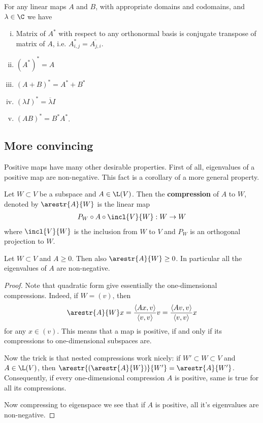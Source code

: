 \begin{lause}\label{basic_adjoint}
	For any linear maps $A$ and $B$, with appropriate domains and codomains, and $\lambda \in \C$ we have
	\begin{enumerate}[i)]
		\item Matrix of $A^{*}$ with respect to any orthonormal basis is conjugate transpose of matrix of $A$, i.e. $A^{*}_{i, j} = \overline{A_{j, i}}$.
		\item $(A^{*})^{*} = A$
		\item $(A + B)^{*} = A^{*} + B^{*}$
		\item $(\lambda I)^{*} = \overline{\lambda} I$
		\item $(AB)^{*} = B^{*}A^{*}$.
	\end{enumerate}
\end{lause}

\subsection{More convincing}

Positive maps have many other desirable properties. First of all, eigenvalues of a positive map are non-negative. This fact is a corollary of a more general property.

\begin{maar}
	Let $W \subset V$ be a subspace and $A \in \L(V)$. Then the \textbf{compression} of $A$ to $W$, denoted by $\arestr{A}{W}$ is the linear map
	\begin{align*}
		P_{W} \circ A \circ \incl{V}{W} : W \to W
	\end{align*}
	where $\incl{V}{W}$ is the inclusion from $W$ to $V$ and $P_{W}$ is an orthogonal projection to $W$.
\end{maar}

\begin{lem}
	Let $W \subset V$ and $A \geq 0$. Then also $\arestr{A}{W} \geq 0$. In particular all the eigenvalues of $A$ are non-negative.
\end{lem}
\begin{proof}
	Note that quadratic form give essentially the one-dimensional compressions. Indeed, if $W = (v)$, then
	\begin{align*}
		\arestr{A}{W} x = \frac{\langle A x, v \rangle}{\langle v, v \rangle} v = \frac{\langle A v, v \rangle}{\langle v, v \rangle} x
	\end{align*}
	for any $x \in (v)$. This means that a map is positive, if and only if its compressions to one-dimensional subspaces are.

	Now the trick is that nested compressions work nicely: if $W' \subset W \subset V$ and $A \in \L(V)$, then $\arestr{(\arestr{A}{W})}{W'} = \arestr{A}{W'}$. Consequently, if every one-dimensional compression $A$ is positive, same is true for all its compressions.

	Now compressing to eigenspace we see that if $A$ is positive, all it's eigenvalues are non-negative.
\end{proof}

